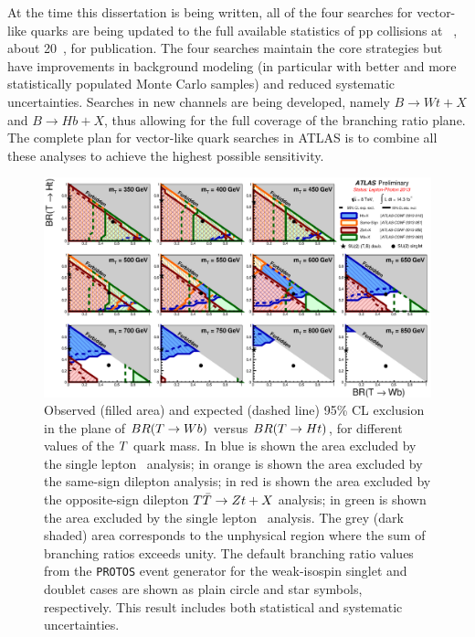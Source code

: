 At the time this dissertation is being
written, all of the four searches for
vector-like quarks are being updated to
the full available statistics of
pp collisions at ~\tev, about 20~\ifb,
for publication. The four searches maintain the
core strategies but have improvements in
background modeling (in particular with better
and more statistically populated Monte Carlo samples)
and reduced systematic uncertainties.
Searches in new channels are being developed, namely
$B\to Wt+X$ and $B\to Hb+X$, thus allowing for
the full coverage of the branching ratio plane.
The complete plan for vector-like quark searches
in ATLAS is to combine all these analyses to 
achieve the highest possible sensitivity.


\begin{landscape}
\begin{figure}[h!bt]
\centering
\includegraphics[width=1.5\textwidth]{results/figures/ATLAS_VLQ_TT_june2013_step4.eps}
\caption{
Observed (filled area) and expected (dashed line) 95\% CL exclusion in the plane of
$BR(\T \to Wb)$ versus $BR(\T \to Ht)$, for different values of the $\T$ quark mass.
In blue is shown the area excluded by the single lepton \htx\ analysis;
in orange is shown the area excluded by the same-sign dilepton analysis;
in red is shown the area excluded by the opposite-sign dilepton $\TTbar\to Zt+X$ analysis;
in green is shown the area excluded by the single lepton \wbx\ analysis.
The grey (dark shaded) area corresponds to the unphysical region where the sum of branching ratios exceeds unity. 
The default branching ratio values from the \texttt{PROTOS} event generator for the weak-isospin singlet and doublet cases 
are shown as plain circle and star symbols, respectively. This result includes both statistical and systematic uncertainties.
\label{fig:limits2D_allcombo}}
\end{figure}
\end{landscape}


